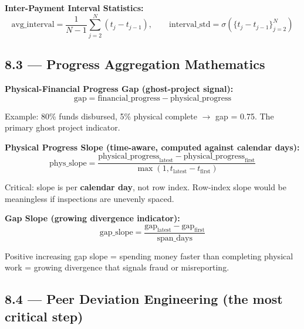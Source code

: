 \documentclass[11pt,a4paper]{article}
\begin{document}
\textbf{Inter-Payment Interval Statistics:}
\[ \text{avg\_interval} = \frac{1}{N-1}\sum_{j=2}^{N}(t_j - t_{j-1}), \qquad \text{interval\_std} = \sigma(\{t_j - t_{j-1}\}_{j=2}^{N}) \]

\subsection{8.3 --- Progress Aggregation Mathematics}

\textbf{Physical-Financial Progress Gap (ghost-project signal):}
\[ \text{gap} = \text{financial\_progress} - \text{physical\_progress} \]

\begin{tcolorbox}[colback=blue!4!white,colframe=blue!60!black,arc=1.5mm,boxrule=0.7pt,left=8pt,right=8pt,top=6pt,bottom=6pt]
Example: 80\% funds disbursed, 5\% physical complete $\rightarrow$ gap = 0.75. The primary ghost project indicator.\\
\end{tcolorbox}

\textbf{Physical Progress Slope (time-aware, computed against calendar days):}
\[ \text{phys\_slope} = \frac{\text{physical\_progress}_\text{latest} - \text{physical\_progress}_\text{first}}{\max(1, t_\text{latest} - t_\text{first})} \]

\begin{tcolorbox}[colback=blue!4!white,colframe=blue!60!black,arc=1.5mm,boxrule=0.7pt,left=8pt,right=8pt,top=6pt,bottom=6pt]
Critical: slope is per \textbf{calendar day}, not row index. Row-index slope would be meaningless if inspections are unevenly spaced.\\
\end{tcolorbox}

\textbf{Gap Slope (growing divergence indicator):}
\[ \text{gap\_slope} = \frac{\text{gap}_\text{latest} - \text{gap}_\text{first}}{\text{span\_days}} \]

\begin{tcolorbox}[colback=blue!4!white,colframe=blue!60!black,arc=1.5mm,boxrule=0.7pt,left=8pt,right=8pt,top=6pt,bottom=6pt]
Positive increasing gap slope = spending money faster than completing physical work = growing divergence that signals fraud or misreporting.\\
\end{tcolorbox}

\subsection{8.4 --- Peer Deviation Engineering (the most critical step)}
\end{document}

